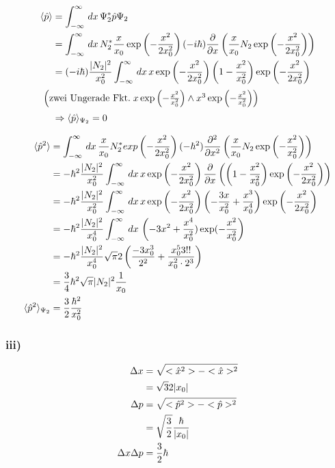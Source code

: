 \begin{align}
    \langle\hat p \rangle &= \int_{-\infty}^{\infty}\,dx\, \Psi _2^*\hat p \Psi _2\\
    &=\int_{-\infty}^{\infty}\,dx\, N_2^* \frac{x}{x_0} \exp\left(-\frac{x^2}{2x_0^2}\right) (-i\hbar) \frac{\partial}{\partial x}\left(\frac{x}{x_0} N_2 \exp \left(-\frac{x^2}{2x_0^2}\right)\right) \\
    &=(-i\hbar) \frac{\lvert N_2\rvert^2}{x_0^2} \int_{-\infty}^{\infty} \,dx\,x\exp\left(-\frac{x^2}{2x_0^2}\right) \left(1-\frac{x^2}{x_0^2}\right)\exp\left(-\frac{x^2}{2x_0^2}\right)\\
    \intertext{
        $\left(\text{zwei Ungerade Fkt.}\; x \exp\left(-\frac{x^2}{x_0^2} \right) \wedge x^3 \exp\left(-\frac{x^2}{x_0^2} \right) \right)$
    }
    &\Rightarrow \langle\hat p \rangle_{\Psi _2}=0
\end{align}

\begin{align}
    \langle\hat p ^2\rangle &= \int_{-\infty}^{\infty}\,dx\, \frac{x}{x_0} N_2^* exp\left(-\frac{x^2}{2x_0^2}\right) (-\hbar^2) \frac{\partial ^2}{\partial x^2}\left(\frac{x}{x_0} N_2 \exp\left(-\frac{x^2}{x_0^2}\right) \right)\\
    &= - \hbar ^2 \frac{\lvert N_2\rvert^2}{x_0^2} \int_{-\infty}^{\infty}\,dx\, x \exp\left(-\frac{x^2}{2x_0^2}\right)\frac{\partial}{\partial x}\left(\left(1-\frac{x^2}{x_0^2}\right)\exp\left(-\frac{x^2}{2x_0^2}\right) \right)\\
    &= - \hbar ^2 \frac{\lvert N_2\rvert^2}{x_0^2} \int_{-\infty}^{\infty}\,dx\, x \exp\left(-\frac{x^2}{2x_0^2}\right)\left(\--\frac{3x}{x_0^2}+\frac{x^3}{x_0^4} \right) \exp\left(-\frac{x^2}{2x_0^2}\right)\\
    &= - \hbar^2 \frac{\lvert N_2\rvert^2}{x_0^4} \int_{-\infty}^{\infty}\,dx\, \left(-3x^2+\frac{x^4}{x_0^2})\exp(-\frac{x^2}{x_0^2}\right)\\
    &= - \hbar^2 \frac{\lvert N_2\rvert^2}{x_0^4} \sqrt{\pi} 2\left(\frac{-3x_0^3}{2^2}+\frac{x_0^5 3!!}{x_0^2\cdot 2^3}\right)\\
    &= \frac{3}{4} \hbar^2 \sqrt{\pi} \lvert N_2\rvert^2 \frac{1}{x_0}\\
    \langle\hat p ^2 \rangle_{\Psi _2}&=\frac{3}{2} \frac{\hbar ^2}{x_0^2}
\end{align}

\subsubsection{iii)}
\begin{align}
\Delta x&= \sqrt{<\hat x ^2>-<\hat x>^2 }\\
&=\sqrt{3}{2} \lvert x_0\rvert\\
\Delta p &= \sqrt{<\hat p ^2>-<\hat p >^2}\\
&=\sqrt{\frac{3}{2}}\frac{\hbar}{\lvert x_0\rvert}\\
\Delta x \Delta p &= \frac{3}{2} \hbar 
\end{align}

